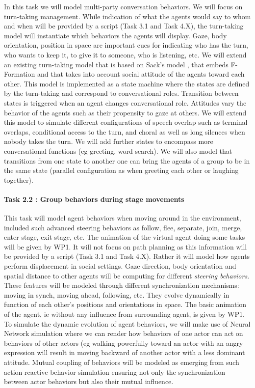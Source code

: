 In this task we will model multi-party conversation behaviors. We will focus on turn-taking management. While indication of what the agents would say to whom and when will be provided by a script (Task 3.1 and Task 4.X), the turn-taking model will instantiate which behaviors the agents will display. Gaze, body orientation, position in space are important cues for indicating who has the turn, who wants to keep it, to give it to someone, who is listening, etc.  We will extend an existing turn-taking model \cite{ RavenetCOP14} that is based on Sack's model \cite{SAC74}, that embeds F-Formation \cite{Kendon90}  and that takes into account social attitude of the agents toward each other. This model is implemented as a state machine where the states are defined by the turn-taking and correspond to conversational roles. Transition between states is triggered when an agent changes conversational role. Attitudes vary the behavior of the agents such as their propensity to gaze at others. We will extend this model to simulate different configurations of speech overlap such as terminal overlaps, conditional access to the turn, and choral \cite{Schegloff2000} as well as long silences when nobody takes the turn. We will add further states to encompass more conversational functions (eg greeting, word search). We will also model that transitions from one state to another one can bring the agents of a group to be in the same state (parallel configuration as when greeting each other or laughing together).


\paragraph{Task 2.2 : Group behaviors during stage movements}

This task will model agent behaviors when moving around in the environment,  included such  advanced  steering behaviors as follow, flee, separate, join, merge, enter stage, exit stage, etc. The animation of the virtual agent doing some tasks will be given by WP1. It will not focus on path planning as this information will be provided by a script (Task 3.1 and Task 4.X). Rather it will model how agents perform displacement in social settings. Gaze direction, body orientation and spatial distance to other agents will be computing for different {\em steering behaviors}. These features will be modeled through different synchronization mechanisms: moving in synch, moving ahead, following, etc. They evolve dynamically in function of each other's  positions and orientations in space. The basic animation of the agent, ie without any influence from surrounding agent, is given by WP1. To simulate the dynamic evolution of agent behaviors,  we will make use of Neural Network simulation \cite{Prepin13} where we can render how behaviors of one actor can act on behaviors of other actors (eg walking powerfully toward an actor with an angry expression will result in moving backward of another actor with a less dominant attitude. Mutual coupling of behaviors will be modeled as emerging from such action-reactive behavior simulation \cite{Prepin13} ensuring not only the synchronization between actor behaviors but also their mutual influence. 


